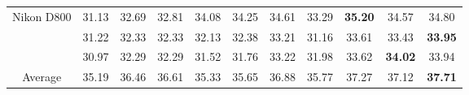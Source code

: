 \documentclass[10pt,twocolumn,letterpaper,sort&compress]{article}
\begin{document}
\begin{table}
\begin{center}
\begin{tabular}{|c||c|c|c|c|c|c|c|c|c|c|}
\\ 
\hline
\multirow{3}{*}{Nikon D800} 
& 31.13 & 32.69 & 32.81 & 34.08 & 34.25 & 34.61 & 33.29 & \textbf{35.20} & 34.57 & 34.80
\\ 
\cline{2-11} 
\multirow{3}{*}{ISO = 6400}   
& 31.22 & 32.33 & 32.33 & 32.13 & 32.38  & 33.21 & 31.16 & 33.61 & 33.43 & \textbf{33.95}
\\ 
\cline{2-11}    
& 30.97 & 32.29 & 32.29 & 31.52 & 31.76 & 33.22 & 31.98 & 33.62 & \textbf{34.02} & 33.94
\\
\hline
Average & 35.19 & 36.46 & 36.61 & 35.33 & 35.65 & 36.88 & 35.77 & 37.27 & 37.12 & \textbf{ 37.71}
\\
\hline
\end{tabular}
\end{center}
\vspace{1mm}
\end{table}
\end{document}
